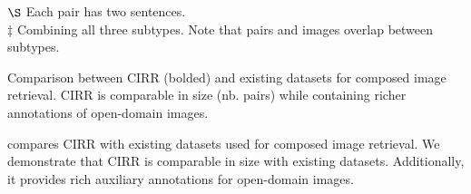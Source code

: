 \documentclass[10pt,twocolumn,letterpaper]{article}
\begin{document}
\begin{table*}
\begin{minipage}{.98\textwidth}
  $\S$ Each pair has two sentences.\\[1.75pt]
  $\ddagger$ Combining all three subtypes. Note that pairs and images overlap between subtypes.\\[1.75pt]
\end{minipage}
  \caption{Comparison between CIRR (bolded) and existing datasets for composed image retrieval. CIRR is comparable in size (nb. pairs) while containing richer annotations of open-domain images.}
  \label{tab:comparison_dst}
  \end{table*}
 
 compares CIRR with existing datasets used for composed image retrieval. We demonstrate that CIRR is comparable in size with existing datasets. Additionally, it provides rich auxiliary annotations for open-domain images.
\end{document}
